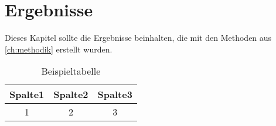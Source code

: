 \chapter{Ergebnisse}
\label{ch:ergebnisse}

Dieses Kapitel sollte die Ergebnisse beinhalten, die mit den Methoden aus \autoref{ch:methodik} erstellt wurden.

\begin{table}[h]
\caption{Beispieltabelle}
\begin{center}
	\begin{tabular}{|c||c|c|}
		\hline
		Spalte1 & Spalte2 & Spalte3 \\ 
		\hline\hline
		   1    &    2    &    3    \\ 
		\hline
	\end{tabular}
\end{center}
\label{tbl:table}
\end{table}